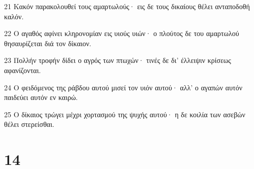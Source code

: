 \par 21 Κακόν παρακολουθεί τους αμαρτωλούς· εις δε τους δικαίους θέλει ανταποδοθή καλόν.
\par 22 Ο αγαθός αφίνει κληρονομίαν εις υιούς υιών· ο πλούτος δε του αμαρτωλού θησαυρίζεται διά τον δίκαιον.
\par 23 Πολλήν τροφήν δίδει ο αγρός των πτωχών· τινές δε δι' έλλειψιν κρίσεως αφανίζονται.
\par 24 Ο φειδόμενος της ράβδου αυτού μισεί τον υιόν αυτού· αλλ' ο αγαπών αυτόν παιδεύει αυτόν εν καιρώ.
\par 25 Ο δίκαιος τρώγει μέχρι χορτασμού της ψυχής αυτού· η δε κοιλία των ασεβών θέλει στερείσθαι.

\chapter{14}

